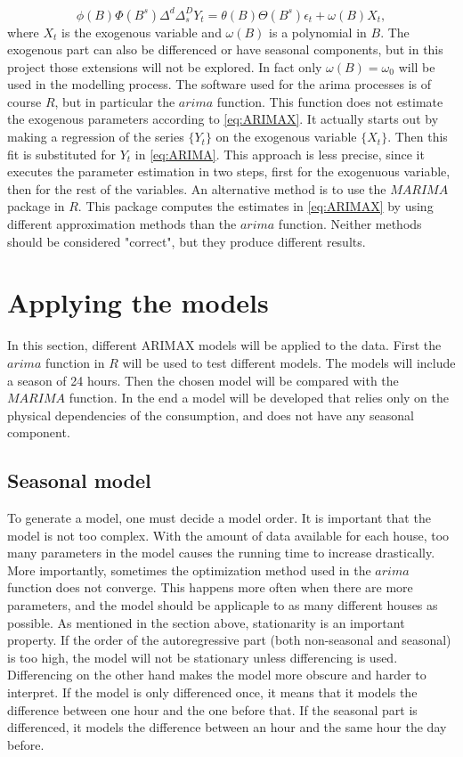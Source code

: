 \begin{equation}
    \phi (B) \Phi (B^s) \Delta^d \Delta_s^D Y_t = \theta (B) \Theta (B^s) \epsilon_t + \omega(B) X_t,
    \label{eq:ARIMAX}
\end{equation}
where $X_t$ is the exogenous variable and $\omega(B)$ is a polynomial in $B$. The exogenous part can also be differenced or have seasonal components, but in this project those extensions will not be explored. In fact only $\omega(B)=\omega_0$ will be used in the modelling process. The software used for the arima processes is of course $R$, but in particular the $arima$ function. This function does not estimate the exogenous parameters according to \cref{eq:ARIMAX}. It actually starts out by making a regression of the series $\{Y_t\}$ on the exogenous variable $\{X_t\}$. Then this fit is substituted for $Y_t$ in \cref{eq:ARIMA}. This approach is less precise, since it executes the parameter estimation in two steps, first for the exogenuous variable, then for the rest of the variables. An alternative method is to use the $MARIMA$ package in $R$. This package computes the estimates in \cref{eq:ARIMAX} by using different approximation methods than the $arima$ function. Neither methods should be considered "correct", but they produce different results.

\section{Applying the models}
In this section, different ARIMAX models will be applied to the data. First the $arima$ function in $R$ will be used to test different models. The models will include a season of 24 hours. Then the chosen model will be compared with the $MARIMA$ function. In the end a model will be developed that relies only on the physical dependencies of the consumption, and does not have any seasonal component.

\subsection{Seasonal model}
To generate a model, one must decide a model order. It is important that the model is not too complex. With the amount of data available for each house, too many parameters in the model causes the running time to increase drastically. More importantly, sometimes the optimization method used in the $arima$ function does not converge. This happens more often when there are more parameters, and the model should be applicaple to as many different houses as possible. As mentioned in the section above, stationarity is an important property. If the order of the autoregressive part (both non-seasonal and seasonal) is too high, the model will not be stationary unless differencing is used. Differencing on the other hand makes the model more obscure and harder to interpret. If the model is only differenced once, it means that it models the difference between one hour and the one before that. If the seasonal part is differenced, it models the difference between an hour and the same hour the day before.

